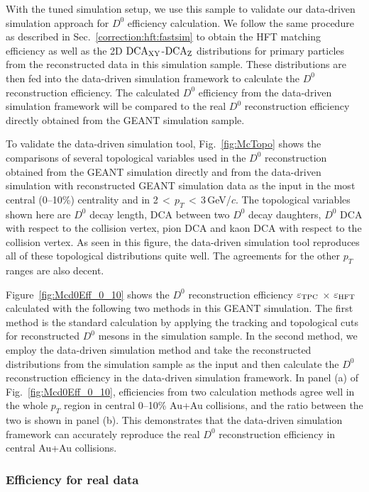 \documentclass[%
 reprint,	
showpacs,
 amsmath,amssymb,
 aps,
 prc,
]{revtex4-1}
\begin{document}
With the tuned simulation setup, we use this sample to validate our data-driven simulation approach for $D^0$ efficiency calculation. We follow the same procedure as described in Sec.~\ref{correction:hft:fastsim} to obtain the HFT matching efficiency as well as the 2D $\textup{DCA}_\textup{XY}$-$\textup{DCA}_\textup{Z}$ distributions for primary particles from the reconstructed data in this simulation sample. These distributions are then fed into the data-driven simulation framework to calculate the $D^0$ reconstruction efficiency. The calculated $D^0$ efficiency from the data-driven simulation framework will be compared to the real $D^0$ reconstruction efficiency directly obtained from the GEANT simulation sample.


To validate the data-driven simulation tool, Fig.~\ref{fig:McTopo} shows the comparisons of several topological variables used in the $D^0$ reconstruction obtained from the GEANT simulation directly and from the data-driven simulation with reconstructed GEANT simulation data as the input in the most central (0--10\%) centrality and in 2\,$<$\,$p_{T}$\,$<$\,3\,GeV/$c$. The topological variables shown here are $D^0$ decay length, DCA between two $D^0$ decay daughters, $D^0$ DCA with respect to the collision vertex, pion DCA and kaon DCA with respect to the collision vertex. As seen in this figure, the data-driven simulation tool reproduces all of these topological distributions quite well. The agreements for the other $p_{T}$ ranges are also decent.

Figure~\ref{fig:Mcd0Eff_0_10} shows the $D^0$ reconstruction efficiency $\varepsilon_{\rm TPC}$ $\times$ $\varepsilon_{\rm HFT}$ calculated with the following two methods in this GEANT simulation. The first method is the standard calculation by applying the tracking and topological cuts for reconstructed $D^0$ mesons in the simulation sample. In the second method, we employ the data-driven simulation method and take the reconstructed distributions from the simulation sample as the input and then calculate the $D^0$ reconstruction efficiency in the data-driven simulation framework. In panel (a) of Fig.~\ref{fig:Mcd0Eff_0_10}, efficiencies from two calculation methods agree well in the whole $p_{T}$ region in central 0--10\% Au+Au collisions, and the ratio between the two is shown in panel (b). This demonstrates that the data-driven simulation framework can accurately reproduce the real $D^0$ reconstruction efficiency in central Au+Au collisions.


\subsubsection{Efficiency for real data}
\label{correction:hft:fordata}
\end{document}
